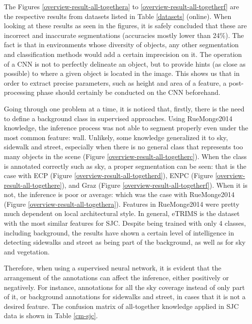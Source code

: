 The Figures \ref{overview-result-all-togethera} to \ref{overview-result-all-togetherf} are the respective results from datasets listed in Table \ref{datasets} (online). When looking at these results as seen in the figures, it is safely concluded that these are incorrect and inaccurate segmentations (accuracies mostly lower than 24\%). The fact is that in environments whose diversity of objects, any other segmentation and classification methods would add a certain imprecision on it. The operation of a CNN is not to perfectly delineate an object, but to provide hints (as close as possible) to where a given object is located in the image. This shows us that in order to extract precise parameters, such as height and area of a feature, a post-processing phase should certainly be conducted on the CNN beforehand.

Going through one problem at a time, it is noticed that, firstly, there is the need to define a background class in supervised approaches. Using RueMonge2014 knowledge, the inference process was not able to segment properly even under the most common feature: wall. Unlikely, some knowledge generalized it to sky, sidewalk and street, especially when there is no general class that represents too many objects in the scene (Figure \ref{overview-result-all-togetherc}). When the class is annotated correctly such as sky, a proper segmentation can be seen: that is the case with ECP (Figure \ref{overview-result-all-togetherd}), ENPC (Figure \ref{overview-result-all-togethere}), and Graz (Figure \ref{overview-result-all-togetherf}). When it is not, the inference is poor or average: which was the case with RueMonge2014 (Figure \ref{overview-result-all-togethera}). Features in RueMonge2014 were pretty much dependent on local architectural style. In general, eTRIMS is the dataset with the most similar features for SJC. Despite being trained with only 4 classes, including background, the results have shown a certain level of intelligence in detecting sidewalks and street as being part of the background, as well as for sky and vegetation.

Therefore, when using a supervised neural network, it is evident that the arrangement of the annotations can affect the inference, either positively or negatively. For instance, annotations for all the sky coverage instead of only part of it, or background annotations for sidewalks and street, in cases that it is not a desired feature. The confusion matrix of all-together knowledge applied in SJC data is shown in Table \ref{cm-sjc}.

